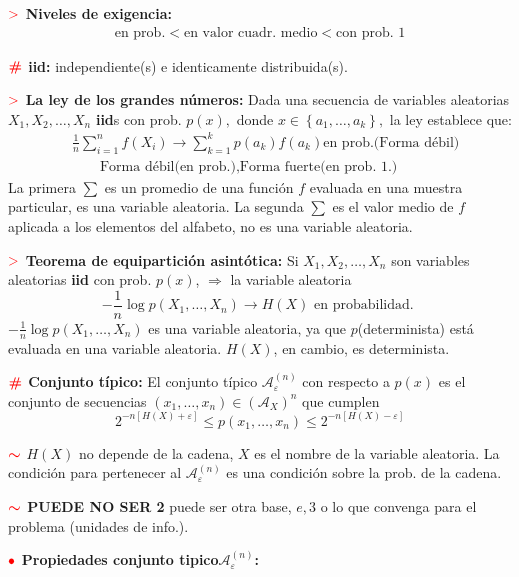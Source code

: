 \documentclass[%
 reprint,
 amsmath,amssymb,
 aps,
]{revtex4-1}
\begin{document}
\textbf{$\textcolor{red}{\mathbf{>}}$ Niveles de exigencia:}
$$
\begin{aligned}
  \text{en prob.} < 
  \text{en valor cuadr. medio} < 
  \text{con prob. 1}
\end{aligned}
$$

\textbf{$\color{red}{\textbf{\#}}$ iid:} independiente(s) e identicamente distribuida(s).

\textbf{$\textcolor{red}{\mathbf{>}}$ La ley de los grandes números:} 
Dada una secuencia de variables aleatorias $X_{1}, X_{2}, \ldots, X_{n}$ \textbf{iid}s con prob. $p(x),$ donde $x \in\left\{a_{1}, \ldots, a_{k}\right\},$ la ley establece que:
$$
\begin{aligned}
  &\frac{1}{n} \sum_{i=1}^{n} f\left(X_{i}\right) 
  \rightarrow
  \sum_{k=1}^{k} p\left(a_{k}\right) f\left(a_{k}\right) \text{en prob.} \text{(Forma débil)}\\
  &\qquad \text{Forma débil}
  \text{(en prob.)} 
  , 
  \text{Forma fuerte}
  \text{(en prob. 1.)} 
\end{aligned}
$$
La primera $\sum$ es un promedio de una función $f$ evaluada en una muestra particular, es
una variable aleatoria. La segunda $\sum$ es el valor medio de $f$ aplicada a los elementos del
alfabeto, no es una variable aleatoria. 

\textbf{$\textcolor{red}{\mathbf{>}}$ Teorema de equipartición asintótica:}
Si $X_{1}, X_{2}, \ldots, X_{n}$ son variables aleatorias \textbf{iid} con prob.
$p(x)$, $\Rightarrow$ la variable aleatoria
$$
-\frac{1}{n} \log p\left(X_{1}, \ldots, X_{n}\right) \rightarrow H(X) \text { en probabilidad. }
$$
$-\frac{1}{n} \log p\left(X_{1}, \ldots, X_{n}\right)$ es una variable aleatoria, ya que $p$(determinista) está evaluada en una variable aleatoria. $H(X)$, en
cambio, es determinista.


\textbf{$\color{red}{\textbf{\#}}$ Conjunto típico:} 
El conjunto típico $\mathcal{A}_{\varepsilon}^{(n)}$ con respecto a $p(x)$ es el conjunto de secuencias $\left(x_{1}, \ldots, x_{n}\right) \in\left(\mathcal{A}_{X}\right)^{n}$
que cumplen
$$
2^{-n[H(X)+\varepsilon]} \leq p\left(x_{1}, \ldots, x_{n}\right) \leq 2^{-n[H(X)-\varepsilon]}
$$

\textbf{$\textcolor{red}{\color{red}{\boldsymbol{\sim}}}$} 
$H(X)$ no depende de la cadena, $X$ es el nombre de la variable aleatoria. La condición para pertenecer al $\mathcal{A}_{\varepsilon}^{(n)}$ es una condición sobre la prob. de la cadena.

\textbf{$\textcolor{red}{\color{red}{\boldsymbol{\sim}}}$ PUEDE NO SER 2} 
puede ser otra base, $e,3$ o lo que convenga para el problema (unidades de info.).

\textbf{$\color{red}{\bullet}$ Propiedades conjunto tipico$\mathcal{A}_{\varepsilon}^{(n)}$:}
\end{document}
